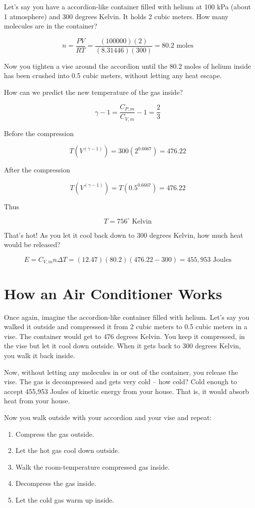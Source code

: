 Let's say you have a accordion-like container filled with helium at 100 kPa (about 1 atmosphere) and 300 degrees Kelvin.  It holds 2 cubic meters.  
How many molecules are in the container?

$$n = \frac{PV}{RT} = \frac{(100000)(2)}{(8.31446)(300)} = 80.2 \text{ moles}$$

Now you tighten a vise around the accordion until the 80.2 moles of helium inside has been crushed into 0.5 cubic meters,  without letting any heat escape.

How can we predict the new temperature of the gas inside?

$$\gamma - 1 = \frac{C_{P,m}}{C_{V,m}} - 1= \frac{2}{3}$$

Before the compression

$$T \left(V^{\left( \gamma - 1 \right)} \right) = 300 \left( 2^{0.6667} \right) = 476.22$$

After the compression

$$T \left(V^{\left( \gamma - 1 \right)} \right) = T \left( 0.5^{0.6667} \right) = 476.22$$

Thus 

$$T = 756^\circ \text{ Kelvin}$$

That's hot!  As you let it cool back down to 300 degrees Kelvin,  how much heat would be released?  

$$E = C_{V,m} n \Delta T = (12.47)(80.2)(476.22 - 300) =  455,953 \text{ Joules}$$

\section{How an Air Conditioner Works}

Once again, imagine the accordion-like container filled with helium.  Let's say you walked it outside and compressed it from 2 cubic meters to 0.5 cubic meters in a vise.  The container would get to 476 degrees Kelvin.  You keep it compressed, in the vise  but let it cool down outside.  When it gets back to 300 degrees Kelvin,  you walk it back inside.

Now,  without letting any molecules in or out of the container,  you release the vise.  The gas is decompressed and gets very cold -- how cold?  Cold enough to accept 455,953 Joules of kinetic energy from your house.  That is,  it would absorb heat from your house.

Now you walk outside with your accordion and your vise and repeat:
\begin{enumerate}
\item Compress the gas outside.
\item Let the hot gas cool down outside.
\item Walk the room-temperature compressed gas inside.
\item Decompress the gas inside.
\item Let the cold gas warm up inside.
\end{enumerate}

